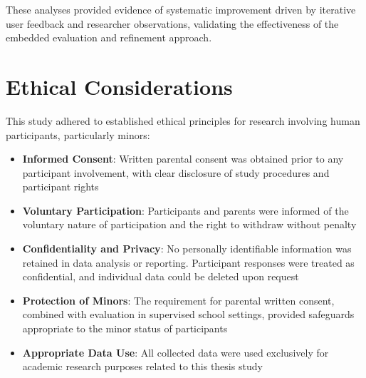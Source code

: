 These analyses provided evidence of systematic improvement driven by iterative user feedback and researcher observations, validating the effectiveness of the embedded evaluation and refinement approach.

\section{Ethical Considerations}

This study adhered to established ethical principles for research involving human participants, particularly minors:

\begin{itemize}
    \item \textbf{Informed Consent}: Written parental consent was obtained prior to any participant involvement, with clear disclosure of study procedures and participant rights
    \item \textbf{Voluntary Participation}: Participants and parents were informed of the voluntary nature of participation and the right to withdraw without penalty
    \item \textbf{Confidentiality and Privacy}: No personally identifiable information was retained in data analysis or reporting. Participant responses were treated as confidential, and individual data could be deleted upon request
    \item \textbf{Protection of Minors}: The requirement for parental written consent, combined with evaluation in supervised school settings, provided safeguards appropriate to the minor status of participants
    \item \textbf{Appropriate Data Use}: All collected data were used exclusively for academic research purposes related to this thesis study
\end{itemize}
